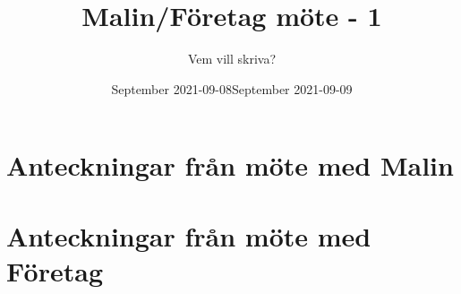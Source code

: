 \documentclass{article}
\title{Malin/Företag möte - 1}
\author{Vem vill skriva?}
\date{}
\begin{document}
\maketitle

\section{Anteckningar från möte med Malin }
\date{September 2021-09-08}

\section{Anteckningar från möte med Företag }
\date{September 2021-09-09}
\end{document}
